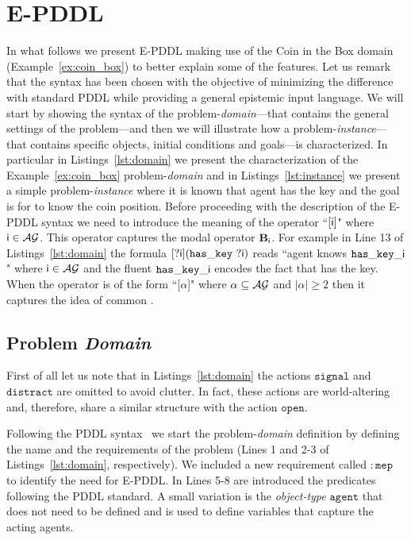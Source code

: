 \section{E-PDDL}
\newcommand{\codetext}[1]{\ensuremath{\mathtt{#1}}}
\newcommand{\probdom}{problem-\emph{domain}\xspace}
\newcommand{\probinst}{problem-\emph{instance}\xspace}
\newcommand{\impltoexpl}{From Implicit to Explicit \KnoBel Update}

In what follows we present E-PDDL making use of the Coin in the Box domain (Example~\ref{ex:coin_box}) to better explain some of the features.
Let us remark that the syntax has been chosen with the objective of minimizing the difference with standard PDDL while providing a general epistemic input language.
We will start by showing the syntax of the \probdom---that contains the general settings of the problem---and then we will illustrate how a \probinst---that contains specific objects, initial conditions and goals---is characterized.
In particular in Listings~\ref{lst:domain} we present the characterization of the Example~\ref{ex:coin_box} \probdom and in Listings~\ref{lst:instance} we present a simple \probinst where it is known that agent  has the key and the goal is for  to know the coin position.
Before proceeding with the description of the E-PDDL syntax we need to introduce the meaning of the operator ``\codetext{[\agent{i}]}" where $\mathsf{i} \in \mathcal{AG}$.
This operator captures the modal operator $\textbf{B}_{\mathsf{\mathsf{i}}}$.
For example in Line 13 of Listings~\ref{lst:domain} the formula \codetext{[?\agent{i}](has\_key\ ?\agent{i})} reads ``agent  knows \codetext{has\_key\_\agent{i}}" where $\mathsf{i} \in \mathcal{AG}$ and the fluent \codetext{has\_key\_\agent{i}} encodes the fact that  has the key.
When the operator is of the form ``[$\alpha$]" where $\alpha \subseteq \mathcal{AG}$ and $|\alpha| \geq 2$ then it captures the idea of common \knobel. %

\subsection{Problem \emph{Domain}}
First of all let us note that in Listings~\ref{lst:domain} the actions \codetext{signal} and \codetext{distract} are omitted to avoid clutter. In fact, these actions are world-altering and, therefore, share a similar structure with the action \codetext{open}.

Following the PDDL syntax~\cite{pddl2.1} we start the \probdom definition by defining the name and the requirements of the problem (Lines 1 and 2-3 of Listings~\ref{lst:domain}, respectively). We included a new requirement called \codetext{:mep} to identify the need for E-PDDL.
In Lines 5-8 are introduced the predicates following the PDDL standard.
A small variation is the \emph{object-type} \codetext{agent} that does not need to be defined and is used to define variables that capture the acting agents.

